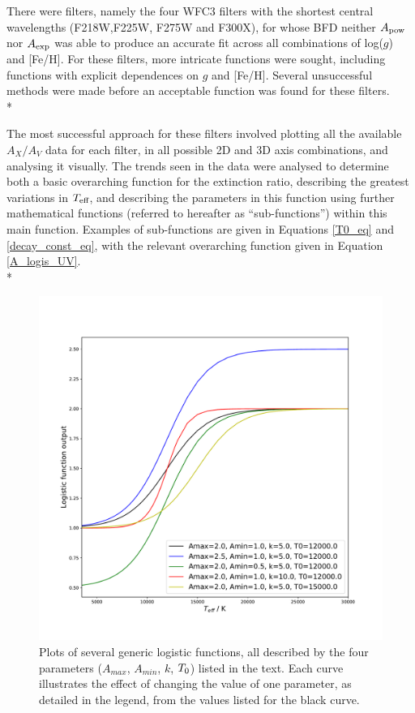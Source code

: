 \documentclass[12pt, a4paper]{report}
\begin{document}
There were filters, namely the four WFC3 filters with the shortest central wavelengths (F218W,F225W, F275W and F300X), for whose BFD neither $A_{\textnormal{pow}}$ nor $A_{\textnormal{exp}}$ was able to produce an accurate fit across all combinations of log($g$) and [Fe/H]. For these filters, more intricate functions were sought, including functions with explicit dependences on $g$ and [Fe/H]. Several unsuccessful methods were made before an acceptable function was found for these filters.\\*

The most successful approach for these filters involved plotting all the available $A_{X}/A_{V}$ data for each filter, in all possible 2D and 3D axis combinations, and analysing it visually. The trends seen in the data were analysed to determine both a basic overarching function for the extinction ratio, describing the greatest variations in $T_{\textnormal{eff}}$, and describing the parameters in this function using further mathematical functions (referred to hereafter as ``sub-functions'') within this main function. Examples of sub-functions are given in Equations \ref{T0_eq} and \ref{decay_const_eq}, with the relevant overarching function given in Equation \ref{A_logis_UV}.\\*

\begin{figure}[h!]
\begin{center}
\includegraphics[width=1.0\textwidth]{generic_logistic_params_illustration.pdf}
\caption{Plots of several generic logistic functions, all described by the four parameters ($A_{max}$, $A_{min}$, $k$, $T_{\textnormal{0}}$) listed in the text. Each curve illustrates the effect of changing the value of one parameter, as detailed in the legend, from the values listed for the black curve.}
\label{logistic_curve_example}
\end{center}
\end{figure}
\end{document}
